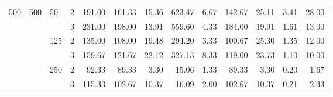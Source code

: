 \begin{tabular}{llllrrrrrrrrr}
\multirow{6}{*}{500} & \multirow{6}{*}{500} & \multirow{2}{*}{50} & 2 & 191.00 & 161.33 &       15.36 & 623.47 &  6.67 & 142.67 &       25.11 & 3.41 & 28.00 \\
    &     &     & 3 & 231.00 & 198.00 &       13.91 & 559.60 &  4.33 & 184.00 &       19.91 & 1.61 & 13.00 \\
\cline{3-13}
    &     & \multirow{2}{*}{125} & 2 & 135.00 & 108.00 &       19.48 & 294.20 &  3.33 & 100.67 &       25.30 & 1.35 & 12.00 \\
    &     &     & 3 & 159.67 & 121.67 &       22.12 & 327.13 &  8.33 & 119.00 &       23.73 & 1.10 & 10.00 \\
\cline{3-13}
    &     & \multirow{2}{*}{250} & 2 &  92.33 &  89.33 &        3.30 &  15.06 &  1.33 &  89.33 &        3.30 & 0.20 &  1.67 \\
    &     &     & 3 & 115.33 & 102.67 &       10.37 &  16.09 &  2.00 & 102.67 &       10.37 & 0.21 &  2.33 \\
\bottomrule
\end{tabular}
